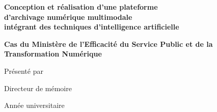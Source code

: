 \begin{titlepage}
  \thispagestyle{empty}
  \centering
  \vspace*{1cm}
  {\Large \nomEcole\par}
  \vspace{1.5cm}

  {\large \typeDocument\par}
  \vspace{0.2cm}
  {\large \diplome}\par
  \vspace{1.6cm}

  {\LARGE\bfseries
    Conception et réalisation d'une plateforme\\
    d'archivage numérique multimodale\\
    intégrant des techniques d'intelligence artificielle
  \par}
  \vspace{0.5cm}
  {\large\bfseries
    Cas du Ministère de l'Efficacité
    du Service Public et de la\\
    Transformation Numérique
  \par}
  \vspace{1.8cm}

  {\large Présenté par\par}
  \vspace{0.2cm}
  {\large \textbf{\auteurNom}\par}
  \vspace{1.5cm}

  {\large Directeur de mémoire\par}
  \vspace{0.3cm}
  {\directeurNom\par}
  {\directeurFonction\par}
  \vspace{0.8cm}

  \vfill
  {Année universitaire \anneeAcademique\par}
\end{titlepage}
